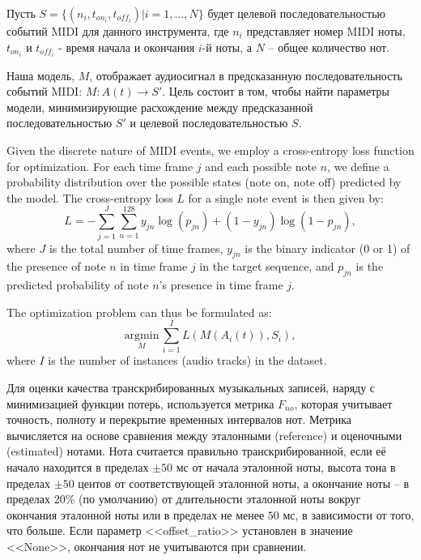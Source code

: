 \documentclass[a4paper, 12pt]{article} %
\begin{document}
Пусть $S = \{(n_i, t_{on_i}, t_{off_i}) | i = 1, \ldots, N\}$ будет целевой последовательностью событий MIDI для данного инструмента, где $n_i$ представляет номер MIDI ноты, $t_{on_i}$ и $t_{off_i}$ - время начала и окончания $i$-й ноты, а $N$ -- общее количество нот.


Наша модель, $M$, отображает аудиосигнал в предсказанную последовательность событий MIDI: $M: A(t) \rightarrow S'$. Цель состоит в том, чтобы найти параметры модели, минимизирующие расхождение между предсказанной последовательностью $S'$ и целевой последовательностью $S$.

Given the discrete nature of MIDI events, we employ a cross-entropy loss function for optimization. For each time frame $j$ and each possible note $n$, we define a probability distribution over the possible states (note on, note off) predicted by the model. The cross-entropy loss $L$ for a single note event is then given by:
\begin{equation}
L = -\sum_{j=1}^{J} \sum_{n=1}^{128} y_{jn} \log(p_{jn}) + (1 - y_{jn}) \log(1 - p_{jn}),
\end{equation}
where $J$ is the total number of time frames, $y_{jn}$ is the binary indicator (0 or 1) of the presence of note $n$ in time frame $j$ in the target sequence, and $p_{jn}$ is the predicted probability of note $n$'s presence in time frame $j$.

The optimization problem can thus be formulated as:
\begin{equation}
\underset{M}{\mathrm{argmin}} \, \sum_{i=1}^{I} L(M(A_i(t)), S_i),
\end{equation}
where $I$ is the number of instances (audio tracks) in the dataset.

Для оценки качества транскрибированных музыкальных записей, наряду с минимизацией функции потерь, используется метрика $F_{no}$, которая учитывает точность, полноту и перекрытие временных интервалов нот. Метрика вычисляется на основе сравнения между эталонными (reference) и оценочными (estimated) нотами. Нота считается правильно транскрибированной, если её начало находится в пределах $\pm50$ мс от начала эталонной ноты, высота тона в пределах $\pm50$ центов от соответствующей эталонной ноты, а окончание ноты -- в пределах $20\%$ (по умолчанию) от длительности эталонной ноты вокруг окончания эталонной ноты или в пределах не менее $50$ мс, в зависимости от того, что больше. Если параметр <<offset\_ratio>> установлен в значение <<None>>, окончания нот не учитываются при сравнении.
\end{document}
